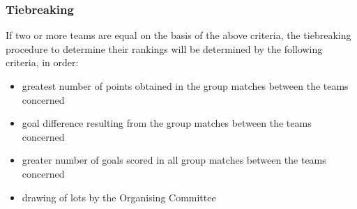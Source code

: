 \subsubsection{Tiebreaking}
If two or more teams are equal on the basis of the above criteria, the tiebreaking procedure to determine their rankings will be determined by the following criteria, in order:
\begin{itemize}
\item greatest number of points obtained in the group matches between the teams concerned
\item goal difference resulting from the group matches between the teams concerned
\item greater number of goals scored in all group matches between the teams concerned
\item drawing of lots by the Organising Committee
\end{itemize}
